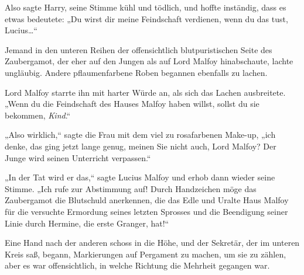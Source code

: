 Also sagte Harry, seine Stimme kühl und tödlich, und hoffte inständig, dass es etwas bedeutete: „Du wirst dir meine Feindschaft verdienen, wenn du das tust, Lucius…“

Jemand in den unteren Reihen der offensichtlich blutpuristischen Seite des Zaubergamot, der eher auf den Jungen als auf Lord Malfoy hinabschaute, lachte ungläubig. Andere pflaumenfarbene Roben begannen ebenfalls zu lachen.

Lord Malfoy starrte ihn mit harter Würde an, als sich das Lachen ausbreitete.
„Wenn du die Feindschaft des Hauses Malfoy haben willst, sollst du sie bekommen, \emph{Kind}.“

„Also wirklich,“ sagte die Frau mit dem viel zu rosafarbenen Make-up, „ich denke, das ging jetzt lange genug, meinen Sie nicht auch, Lord Malfoy? Der Junge wird seinen Unterricht verpassen.“

„In der Tat wird er das,“ sagte Lucius Malfoy und erhob dann wieder seine Stimme. „Ich rufe zur Abstimmung auf! Durch Handzeichen möge das Zaubergamot die Blutschuld anerkennen, die das Edle und Uralte Haus Malfoy für die versuchte Ermordung seines letzten Sprosses und die Beendigung seiner Linie durch Hermine, die erste Granger, hat!“

Eine Hand nach der anderen schoss in die Höhe, und der Sekretär, der im unteren Kreis saß, begann, Markierungen auf Pergament zu machen, um sie zu zählen, aber es war offensichtlich, in welche Richtung die Mehrheit gegangen war.

